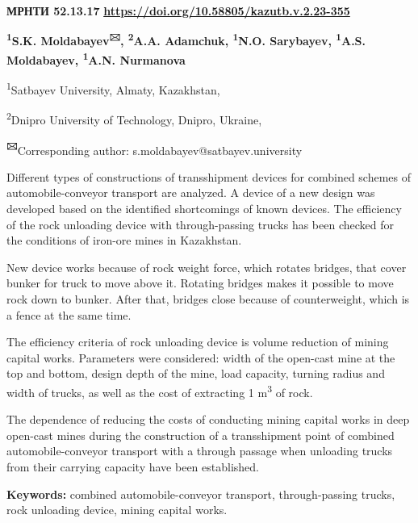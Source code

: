 \newpage
{\bfseries МРНТИ 52.13.17}
\hfill {\bfseries \href{https://doi.org/10.58805/kazutb.v.2.23-355}{https://doi.org/10.58805/kazutb.v.2.23-355}}


\begin{center}
{\bfseries \textsuperscript{1}S.K. Moldabayev\textsuperscript{🖂}, \textsuperscript{2}A.A. Adamchuk, \textsuperscript{1}N.O. Sarybayev, \textsuperscript{1}A.S. Moldabayev, \textsuperscript{1}A.N. Nurmanova}

\textsuperscript{1}Satbayev University, Almaty, Kazakhstan,

\textsuperscript{2}Dnipro University of Technology, Dnipro, Ukraine,

{\bfseries \textsuperscript{🖂}}Corresponding author:
s.moldabayev@satbayev.university
\end{center}

Different types of constructions of transshipment devices for combined
schemes of automobile-conveyor transport are analyzed. A device of a new
design was developed based on the identified shortcomings of known
devices. The efficiency of the rock unloading device with
through-passing trucks has been checked for the conditions of iron-ore
mines in Kazakhstan.

New device works because of rock weight force, which rotates bridges,
that cover bunker for truck to move above it. Rotating bridges makes it
possible to move rock down to bunker. After that, bridges close because
of counterweight, which is a fence at the same time.

The efficiency criteria of rock unloading device is volume reduction of
mining capital works. Parameters were considered: width of the open-cast
mine at the top and bottom, design depth of the mine, load capacity,
turning radius and width of trucks, as well as the cost of extracting 1
m\textsuperscript{3} of rock.

The dependence of reducing the costs of conducting mining capital works
in deep open-cast mines during the construction of a transshipment point
of combined automobile-conveyor transport with a through passage when
unloading trucks from their carrying capacity have been established.

{\bfseries Keywords:} combined automobile-conveyor transport,
through-passing trucks, rock unloading device, mining capital works.

